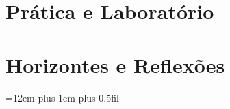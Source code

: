 \documentclass[12pt,a4paper,oneside,openright]{abntex2}
\theoremstyle{definition}
\begin{document}
\part{Prática e Laboratório}




\part{Horizontes e Reflexões}




\postextual

\emergencystretch=12em
\rightskip=0pt plus 1em plus 0.5fil









\end{document}
